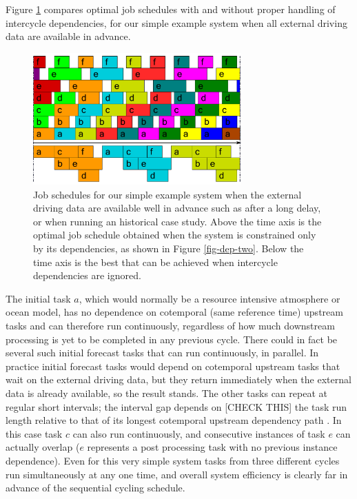 \documentclass[11pt,a4paper]{article}
\begin{document}
Figure \ref{fig-time-two} compares optimal job schedules with and
without proper handling of intercycle dependencies, for our simple
example system when all external driving data are available in advance.
\begin{figure} 
    \begin{center} 
        \includegraphics[width=8cm]{timeline-two}
    \end{center} 
    \caption{\small Job schedules for our simple example system when the
    external driving data are available well in advance such as after a
    long delay, or when running an historical case study. Above the time
    axis is the optimal job schedule obtained when the system is
    constrained only by its dependencies, as shown in Figure
    \ref{fig-dep-two}.  Below the time axis is the best that can be
    achieved when intercycle dependencies are ignored.} 
    \label{fig-time-two}
\end{figure} 
The initial task $a$, which would normally be a resource intensive
atmosphere or ocean model, has no dependence on cotemporal (same
reference time) upstream tasks and can therefore run continuously,
regardless of how much downstream processing is yet to be
completed in any previous cycle. There could in fact be several such
initial forecast tasks that can run continuously, in parallel. In
practice initial forecast tasks would depend on cotemporal upstream
tasks that wait on the external driving data, but they return 
immediately when the external data is already available, so the result
stands. The other tasks can repeat at regular short intervals; the
interval gap depends on [CHECK THIS] the task run length relative to
that of its longest cotemporal upstream dependency path .
In this case task $c$ can also run continuously, and consecutive
instances of task $e$ can actually overlap ($e$ represents a post
processing task with no previous instance dependence). Even for this
very simple system tasks from three different cycles run simultaneously
at any one time, and overall system efficiency is clearly far in advance
of the sequential cycling schedule. 
\end{document}
